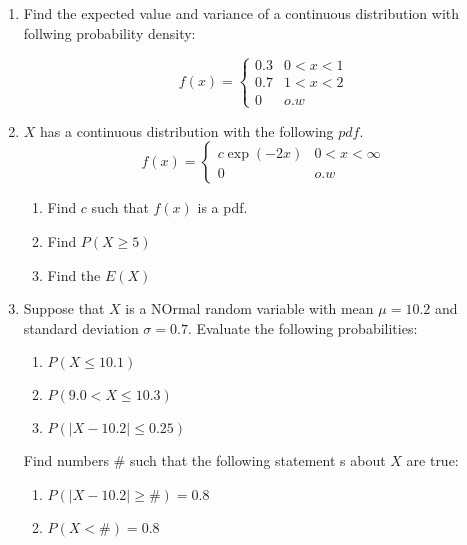 \documentclass[11pt]{article}\usepackage[]{graphicx}\usepackage[]{color}
\begin{document}

\pagestyle{fancy} 


\begin{enumerate}
	\item Find the expected value and variance of a continuous distribution with follwing probability density:
	
$$
	f(x)=
	\begin{cases}
	   0.3 & 0< x< 1 \\
	    0.7 & 1< x< 2 \\
	    0  & o.w 
	\end{cases}
$$
\vspace{5cm}

\item $X$ has a continuous distribution with the following $pdf$.
  $$
	f(x)=
	\begin{cases}
	   c \exp({-2x}) & 0< x< \infty \\
	    0  & o.w 
	\end{cases}
$$
    \begin{enumerate}
        \item Find $c$ such that $f(x)$ is a pdf.
        \vspace{2cm}
        \item Find $P(X \ge 5)$
        \vspace{2cm}
        \item Find the $E(X)$
    \end{enumerate}
    
  \newpage
  \item Suppose that $X$ is a NOrmal random variable with mean $\mu = 10.2$ and standard deviation $\sigma= 0.7$. Evaluate the following probabilities:
      \begin{enumerate}
            \item $P(X\leq 10.1)$
            \vspace{3cm}
            \item $P(9.0 < X \leq 10.3)$
            \vspace{3cm}
            \item $P(\vert X- 10.2\vert\leq 0.25)$
            \vspace{5cm}
            
      \end{enumerate}
      Find numbers $\#$ such that the following statement s about $X$ are true:
      \begin{enumerate}
            \item $P(\vert X- 10.2\vert\ge \#)= 0.8$
            \vspace{5cm}
            \item $P(X< \#)= 0.8$
      \end{enumerate}    
\end{enumerate}
\end{document}
